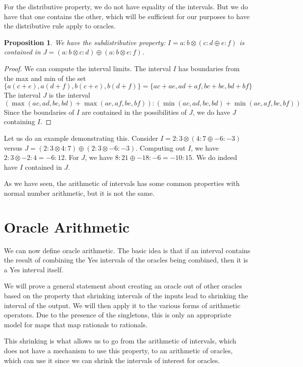 \documentclass[12pt]{article}
\newtheorem{proposition}{Proposition}
\theoremstyle{remark}
\begin{document}
For the distributive property, we do not have equality of the intervals. But we do have that one contains the other, which will be sufficient for our purposes to have the distributive rule apply to oracles. 

\begin{proposition}
We have the subdistributive property: $I = a:b\otimes(c:d \oplus e:f)$ is contained in $J = (a:b \otimes c:d) \oplus (a:b \otimes e:f)$. 
\end{proposition}

\begin{proof}
We can compute the interval limits. The interval $I$ has boundaries from the max and min of the set 
\[
\{a(c+e), a(d+f), b(c+e), b(d+f)\} = \{ac+ae, ad+af, bc+be, bd+bf\}
\] 
The interval $J$ is the interval 
\[
(\max(ac, ad, bc, bd) + \max(ae, af, be, bf) ) : (\min(ac, ad, bc, bd) + \min(ae, af, be, bf) )
\]
Since the boundaries of $I$ are contained in the possibilities of $J$, we do have $J$ containing $I$.
\end{proof}

Let us do an example demonstrating this. Consider $I = 2:3 \otimes ( 4:7 \oplus -6:-3)$ versus $J = (2:3 \otimes 4:7) \oplus (2:3 \otimes -6:-3)$. Computing out $I$, we have $2:3 \otimes -2:4 = -6:12$. For $J$, we have $8:21 \oplus -18:-6 = -10: 15$. We do indeed have $I$ contained in $J$.

As we have seen, the arithmetic of intervals has some common properties with normal number arithmetic, but it is not the same.

\section{Oracle Arithmetic}

We can now define oracle arithmetic. The basic idea is that if an interval contains the result of combining the Yes intervals of the oracles being combined, then it is a Yes interval itself. 

We will prove a general statement about creating an oracle out of other oracles based on the property that shrinking intervals of the inputs lead to shrinking the interval of the output. We will then apply it to the various forms of arithmetic operators. Due to the presence of the singletons, this is only an appropriate model for maps that map rationals to rationals.

This shrinking is what allows us to go from the arithmetic of intervals, which does not have a mechanism to use this property, to an arithmetic of oracles, which can use it since we can shrink the intervals of interest for oracles. 
\end{document}
